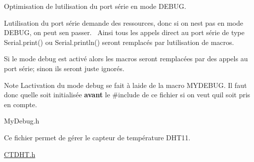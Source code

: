 Optimisation de l\textquotesingle{}utilisation du port série en mode DEBUG.

L\textquotesingle{}utilisation du port série demande des ressources, donc si on n\textquotesingle{}est pas en mode DEBUG, on peut s\textquotesingle{}en passer.~\newline
 Ainsi tous les appels direct au port série de type Serial.\+print() ou Serial.\+println() seront remplacés par l\textquotesingle{}utilisation de macros.

Si le mode debug est activé alors les macros seront remplacées par des appels au port série; sinon ils seront juste ignorés.

\begin{DoxyNote}{Note}
L\textquotesingle{}activation du mode debug se fait à l\textquotesingle{}aide de la macro MYDEBUG. Il faut donc qu\textquotesingle{}elle soit initialisée {\bfseries{avant}} le \#include de ce fichier si on veut qu\textquotesingle{}il soit pris en compte.
\end{DoxyNote}
My\+Debug.\+h

Ce fichier permet de gérer le capteur de température DHT11.

\mbox{\hyperlink{_c_t_d_h_t_8h}{CTDHT.\+h}} 